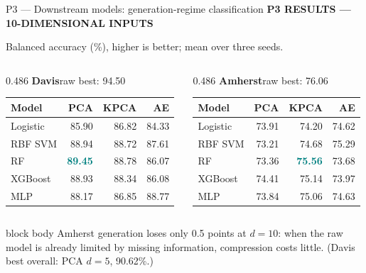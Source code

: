 \documentclass[aspectratio=169,11pt]{beamer}
\newcommand{\sectiontag}[1]{{\footnotesize\usebeamercolor[fg]{structure}\textbf{#1}}\par\vspace{0.10cm}}
\newcommand{\smallmuted}[1]{{\footnotesize\color{slate}#1\par}}
\begin{document}
\begin{frame}{P3 — Downstream models: generation-regime classification}
\sectiontag{P3 \quad RESULTS — 10-DIMENSIONAL INPUTS}
\smallmuted{Balanced accuracy (\%), higher is better; mean over three seeds.}\vspace{0.18cm}
\begin{columns}[T,onlytextwidth]
\begin{column}{0.486\textwidth}
\textbf{Davis}\hfill{\scriptsize raw best: 94.50}\par\vspace{0.12cm}
{\fontsize{8.8}{10.4}\selectfont
\setlength{\tabcolsep}{3.9pt}
\renewcommand{\arraystretch}{1.39}
\begin{tabular}{@{}lrrr@{}}\toprule
\textbf{Model} & \textbf{PCA} & \textbf{KPCA} & \textbf{AE}\\\midrule
Logistic & 85.90 & 86.82 & 84.33\\
RBF SVM & 88.94 & 88.72 & 87.61\\
RF & \textcolor{teal}{\textbf{89.45}} & 88.78 & 86.07\\
XGBoost & 88.93 & 88.34 & 86.08\\
MLP & 88.17 & 86.85 & 88.77\\
\bottomrule\end{tabular}}
\end{column}
\begin{column}{0.486\textwidth}
\textbf{Amherst}\hfill{\scriptsize raw best: 76.06}\par\vspace{0.12cm}
{\fontsize{8.8}{10.4}\selectfont
\setlength{\tabcolsep}{3.9pt}
\renewcommand{\arraystretch}{1.39}
\begin{tabular}{@{}lrrr@{}}\toprule
\textbf{Model} & \textbf{PCA} & \textbf{KPCA} & \textbf{AE}\\\midrule
Logistic & 73.91 & 74.20 & 74.62\\
RBF SVM & 73.21 & 74.68 & 75.29\\
RF & 73.36 & \textcolor{teal}{\textbf{75.56}} & 73.68\\
XGBoost & 74.41 & 75.14 & 73.97\\
MLP & 73.84 & 75.06 & 74.63\\
\bottomrule\end{tabular}}
\end{column}
\end{columns}
\vspace{0.30cm}
\begin{beamercolorbox}[wd=\linewidth,sep=0.14cm]{block body}
\footnotesize Amherst generation loses only 0.5 points at $d=10$: when the raw model is already limited by missing information, compression costs little. (Davis best overall: PCA $d=5$, 90.62\%.)
\end{beamercolorbox}
\end{frame}
\end{document}
